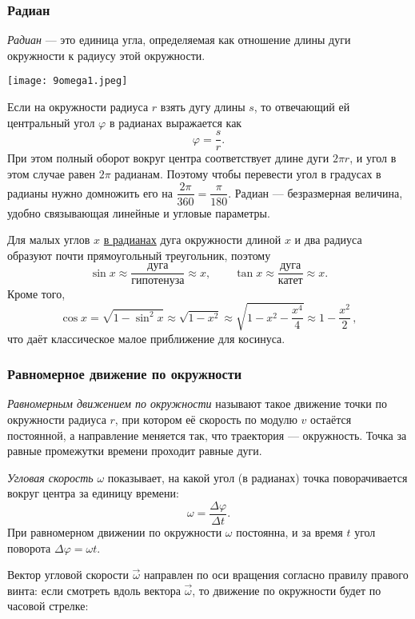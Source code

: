 \documentclass[12pt, a4paper]{article}%
\begin{document}
\subsubsection*{Радиан}
\textit{Радиан} — это единица угла, определяемая как отношение длины дуги окружности к радиусу этой окружности. 


\begin{center}
\texttt{[image: 9omega1.jpeg]}
\label{fig:mpr}
\end{center}


Если на окружности радиуса $r$ взять дугу длины $s$, то отвечающий ей центральный угол $\varphi$ в радианах выражается как
\[
\varphi = \frac{s}{r}.
\]
При этом полный оборот вокруг центра соответствует длине дуги $2\pi r$, и угол в этом случае равен $2\pi$ радианам. Поэтому чтобы перевести угол в градусах в радианы нужно домножить его на $\dfrac{2\pi}{360} = \dfrac{\pi}{180}$. Радиан — безразмерная величина, удобно связывающая линейные и угловые параметры.

Для малых углов $x$ \underline{в радианах} дуга окружности длиной $x$ и два радиуса образуют почти прямоугольный треугольник, поэтому
\[
\sin x \approx \frac{\text{дуга}}{\text{гипотенуза}} \approx x,
\qquad
\tan x \approx \frac{\text{дуга}}{\text{катет}} \approx x.
\]
Кроме того,
\[
\cos x = \sqrt{1 - \sin^2 x} \approx \sqrt{1 - x^2} \approx \sqrt{1-x^2-\frac{x^4}{4}}\approx1 - \frac{x^2}{2}\,,
\]
что даёт классическое малое приближение для косинуса.


\subsubsection*{Равномерное движение по окружности}
\textit{Равномерным движением по окружности} называют такое движение точки по окружности радиуса $r$, при котором её скорость по модулю $v$ остаётся постоянной, а направление меняется так, что траектория — окружность. Точка за равные промежутки времени проходит равные дуги.


\textit{Угловая скорость} $\omega$ показывает, на какой угол (в радианах) точка поворачивается вокруг центра за единицу времени:
\[
\omega = \frac{\Delta\varphi}{\Delta t}.
\]
При равномерном движении по окружности $\omega$ постоянна, и за время $t$ угол поворота $\Delta \varphi = \omega t$.

Вектор угловой скорости $\vec\omega$ направлен по оси вращения согласно правилу правого винта: если смотреть вдоль вектора $\vec\omega$, то движение по окружности будет по часовой стрелке:
\end{document}
